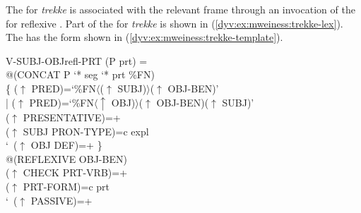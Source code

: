 \documentclass[output=paper]{langsci/langscibook}
\begin{document}
The  for \textit{trekke} is associated with the relevant frame through an invocation of the  for reflexive .
Part of the  for \textit{trekke} is shown in  (\ref{dyv:ex:mweiness:trekke-lex}).
The  has the form shown in  (\ref{dyv:ex:mweiness:trekke-template}).


\ea\label{dyv:ex:mweiness:trekke-template}
{\sffamily 
V-SUBJ-OBJrefl-PRT (P prt) =\\%
\hspace{1.5em} @(CONCAT P `* seg `* prt  \%FN)\\%
\hspace{1.5em}  \{ \enspace ($\uparrow$  PRED)=`\%FN$\langle$($\uparrow$ SUBJ)$\rangle$($\uparrow$ OBJ-BEN)'\\%
\hspace{1.5em} | \enspace ($\uparrow$  PRED)=`\%FN$\langle\uparrow$ OBJ)$\rangle$($\uparrow$  OBJ-BEN)($\uparrow$ SUBJ)'\\%
\hspace{1.5em} \quad ($\uparrow$ PRESENTATIVE)=+\\%
\hspace{1.5em} \quad ($\uparrow$ SUBJ PRON-TYPE)=c expl\\%
\hspace{1.5em} \quad \char`~($\uparrow$ OBJ DEF)=+ \enspace \}\\%
\hspace{1.5em} @(REFLEXIVE OBJ-BEN)\\%
\hspace{1.5em} ($\uparrow$ CHECK PRT-VRB)=+\\%
\hspace{1.5em} ($\uparrow$ PRT-FORM)=c prt\\%
\hspace{1.5em} \char`~($\uparrow$ PASSIVE)=+
}
\z
\end{document}
